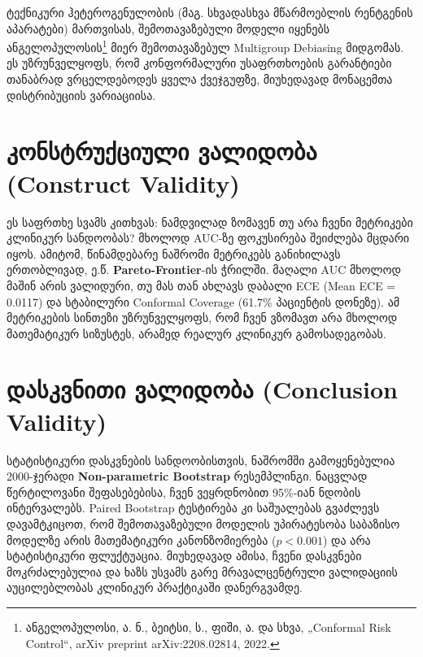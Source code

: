 \documentclass[12pt,a4paper,oneside]{report}
\begin{document}
ტექნიკური ჰეტეროგენულობის (მაგ. სხვადასხვა მწარმოებლის რენტგენის აპარატები) მართვისას, შემოთავაზებული მოდელი იყენებს ანგელოპულოსის\footnote{ანგელოპულოსი, ა. ნ., ბეიტსი, ს., ფიში, ა. და სხვა, „Conformal Risk Control“, arXiv preprint arXiv:2208.02814, 2022.} მიერ შემოთავაზებულ Multigroup Debiasing მიდგომას. ეს უზრუნველყოფს, რომ კონფორმალური უსაფრთხოების გარანტიები თანაბრად ვრცელდებოდეს ყველა ქვეჯგუფზე, მიუხედავად მონაცემთა დისტრიბუციის ვარიაციისა.
\section{კონსტრუქციული ვალიდობა (Construct Validity)}
ეს საფრთხე სვამს კითხვას: ნამდვილად ზომავენ თუ არა ჩვენი მეტრიკები კლინიკურ სანდოობას? მხოლოდ AUC-ზე ფოკუსირება შეიძლება მცდარი იყოს. ამიტომ, წინამდებარე ნაშრომი მეტრიკებს განიხილავს ერთობლივად, ე.წ. \textbf{Pareto-Frontier}-ის ჭრილში. მაღალი AUC მხოლოდ მაშინ არის ვალიდური, თუ მას თან ახლავს დაბალი ECE (Mean ECE = 0.0117) და სტაბილური Conformal Coverage (61.7\% პაციენტის დონეზე). ამ მეტრიკების სინთეზი უზრუნველყოფს, რომ ჩვენ ვზომავთ არა მხოლოდ მათემატიკურ სიზუსტეს, არამედ რეალურ კლინიკურ გამოსადეგობას.

\section{დასკვნითი ვალიდობა (Conclusion Validity)}
სტატისტიკური დასკვნების სანდოობისთვის, ნაშრომში გამოყენებულია 2000-ჯერადი \textbf{Non-parametric Bootstrap} რესემპლინგი. ნაცვლად წერტილოვანი შეფასებებისა, ჩვენ ვეყრდნობით 95\%-იან ნდობის ინტერვალებს. Paired Bootstrap ტესტირება კი საშუალებას გვაძლევს დავამტკიცოთ, რომ შემოთავაზებული მოდელის უპირატესობა საბაზისო მოდელზე არის მათემატიკური კანონზომიერება ($p < 0.001$) და არა სტატისტიკური ფლუქტუაცია. მიუხედავად ამისა, ჩვენი დასკვნები მოკრძალებულია და ხაზს უსვამს გარე მრავალცენტრული ვალიდაციის აუცილებლობას კლინიკურ პრაქტიკაში დანერგვამდე.
\end{document}
